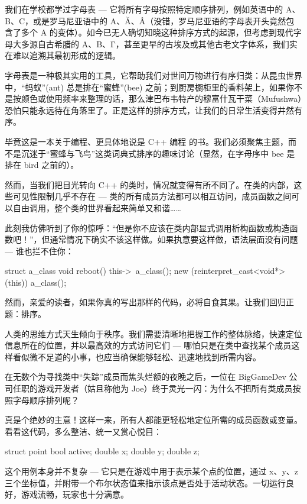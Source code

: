 
我们在学校都学过字母表 --- 它将所有字母按照特定顺序排列，例如英语中的 A、B、C，或是罗马尼亚语中的 A、Ă、Â（没错，罗马尼亚语的字母表开头竟然包含了多个 A 的变体）。如今已无人确切知晓这种排序方式的起源，但考虑到现代字母大多源自古希腊的 Α、Β、Γ，甚至更早的古埃及或其他古老文字体系，我们实在难以追溯其最初形成的逻辑。

字母表是一种极其实用的工具，它帮助我们对世间万物进行有序归类：从昆虫世界中，“蚂蚁”(ant) 总是排在“蜜蜂”(bee) 之前；到厨房橱柜里的香料架上，如果你不是按颜色或使用频率来整理的话，那么津巴布韦特产的穆富什瓦干菜（Mufushwa）恐怕只能永远待在角落里了。正是这样的排序方式，让我们的日常生活变得井然有序。

毕竟这是一本关于编程、更具体地说是 C++ 编程 的书。我们必须聚焦主题，而不是沉迷于“蜜蜂与飞鸟”这类词典式排序的趣味讨论（显然，在字母序中 bee 是排在 bird 之前的）。

然而，当我们把目光转向 C++ 的类时，情况就变得有所不同了。在类的内部，这些可见性限制几乎不存在 --- 类的所有成员方法都可以相互访问，成员函数之间可以自由调用，整个类的世界看起来简单又和谐……

此刻我仿佛听到了你的惊呼：“但是你不应该在类内部显式调用析构函数或构造函数吧！”，但通常情况下确实不该这样做。如果执意要这样做，语法层面没有问题 --- 谁也拦不住你：

\begin{cpp}
struct a_class {
  void reboot() {
    this->~a_class();
    new (reinterpret_cast<void*>(this)) a_class();
  }
}
\end{cpp}


然而，亲爱的读者，如果你真的写出那样的代码，必将自食其果。让我们回归正题：排序。

人类的思维方式天生倾向于秩序。我们需要清晰地把握工作的整体脉络，快速定位信息所在的位置，并以最高效的方式访问它们 --- 哪怕只是在类中查找某个成员这样看似微不足道的小事，也应当确保能够轻松、迅速地找到所需内容。

在无数个为寻找类中“失踪”成员而焦头烂额的夜晚之后，一位在 BigGameDev 公司任职的游戏开发者（姑且称他为 Joe）终于灵光一闪：为什么不把所有类成员按照字母顺序排列呢？

真是个绝妙的主意！这样一来，所有人都能更轻松地定位所需的成员函数或变量。看看这代码，多么整洁、统一又赏心悦目：

\begin{cpp}
struct point {
  bool active;
  double x;
  double y;
  double z;
}
\end{cpp}

这个用例本身并不复杂 --- 它只是在游戏中用于表示某个点的位置，通过 x、y、z 三个坐标值，并附带一个布尔状态值来指示该点是否处于活动状态。一切运行良好，游戏流畅，玩家也十分满意。

